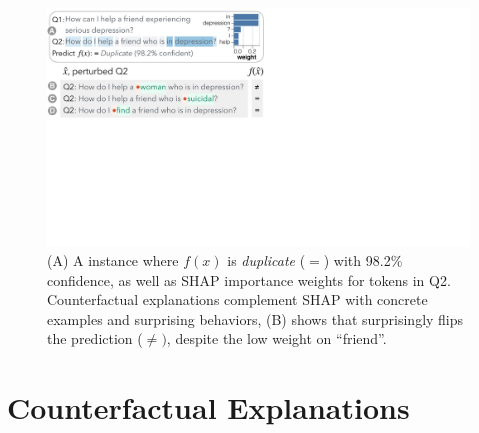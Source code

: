 
\newcommand{\fwone}[1]{\colbox{cfwone}{#1}\xspace}
\newcommand{\fwtwo}[1]{\colbox{cfwtwo}{#1}\xspace}
\newcommand{\fwthree}[1]{\colbox{cfwthree}{#1}\xspace}
\newcommand{\fwfour}[1]{\colbox{cfwfour}{#1}\xspace}

\newcommand{\fexp}[2]{\texttt{[{\color{darkgray}{#1:#2}}]}\xspace}
\newcommand{\fexptag}[1]{\fexp{TAG}{#1}}
\newcommand{\fexpfrom}[1]{\fexp{FROM}{#1}}
\newcommand{\fexpto}[1]{\fexp{TO}{#1}}
\newcommand{\fexptemp}[1]{\fexp{TEMP}{#1}}


\begin{figure}[t]
\centering
\includegraphics[trim={0 21cm 33cm 0cm},clip,width=1\columnwidth]{figures/explanation_v2.pdf}
\vspace{-10pt}
\caption{
(A) A \qqp instance where %
$f(x)$ is \emph{duplicate} ($=$) with 98.2\% confidence, as well as SHAP importance weights for tokens in Q2.
Counterfactual explanations complement SHAP with concrete examples and surprising behaviors, \eg (B) shows that  surprisingly flips the prediction ($\neq)$, despite the low weight on ``friend''.
}
\vspace{-10pt}
\label{fig:explanation}
\end{figure}
\section{Counterfactual Explanations}
\label{sec:app_explain}

